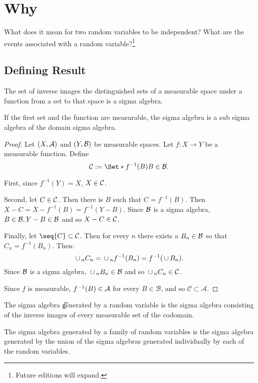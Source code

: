 

\section*{Why}

What does it mean for two random variables to be independent?
What are the events associated with a random variable?\footnote{Future editions will expand.}

\subsection*{Defining Result}

\begin{proposition}
The set of inverse images the distinguished sets of a measurable space under a function from a set to that space is a sigma algebra.

If the first set and the function are measurable, the sigma algebra is a sub sigma algebra of the domain sigma algebra.

\begin{proof}Let $(X, \mathcal{A})$ and $(Y, \mathcal{B})$ be measurable spaces.
Let $f: X \to Y$ be a measurable function. Define
\[
\SC := \Set*{f^{-1}(B)}{B \in \SB}.
\]

First, since $f^{-1}(Y) = X$, $X \in \mathcal{C}$.

Second, let $C \in \mathcal{C}$. Then there is $B$ such that $C = f^{-1}(B)$. Then $X - C = X - f^{-1}(B) = f^{-1}(Y - B)$.
Since $\mathcal{B}$ is a sigma algebra, $B \in \mathcal{B}, Y - B \in \mathcal{B}$ and so $X - C \in \mathcal{C}$.

Finally, let $\seq{C} \subset \SC$.
Then for every $n$ there exists a $B_n \in \mathcal{B}$ so that $C_n = f^{-1}(B_n)$.
Then:
\[
\,\cup\,_{n} C_n = \,\cup\,_n f^{-1}(B_n) = f^{-1}(\,\cup\, B_n).
\]
Since $\mathcal{B}$ is a sigma algebra,
$\,\cup\,_n B_n \in \mathcal{B}$ and so $\,\cup\,_{n} C_n \in \mathcal{C}$.

Since $f$ is measurable, $f^{-1}(B) \in \mathcal{A}$ for every $B \in \mathcal{B} $, and so $\mathcal{C}  \subset \mathcal{A} $.
\end{proof}
\end{proposition}

The sigma algebra \t{generated by a random variable} is the sigma algebra consisting of the inverse images of every measurable set of the codomain.

The sigma algebra generated by a family of random variables is the sigma algebra generated by the union of the sigma algebras generated individually by each of the random variables.


